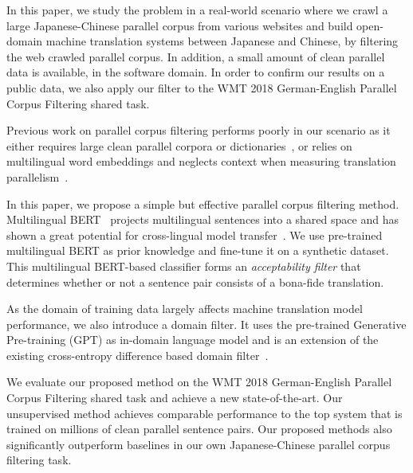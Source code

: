\documentclass[11pt,a4paper]{article}
\begin{document}
In this paper, we study the problem in a real-world scenario where we crawl a large Japanese-Chinese parallel corpus from various websites and build open-domain machine translation systems between Japanese and Chinese, by filtering the web crawled parallel corpus. In addition, a small amount of clean parallel data is available, in the software domain.  In order to confirm our results on a public data, we also apply our filter to the WMT 2018 German-English Parallel Corpus Filtering shared task.

Previous work on parallel corpus filtering performs poorly in our scenario as it either requires large clean parallel corpora or dictionaries~\cite{xu2017zipporah,artetxe2018margin,junczys2018dual,chaudhary2019low}, or relies on multilingual word embeddings and neglects context when measuring translation parallelism~\cite{hangya2018unsupervised}.




In this paper, we propose a simple but effective parallel corpus filtering method.
Multilingual BERT~\cite{devlin2018bert} projects multilingual sentences into a shared space and has shown a great potential for cross-lingual model transfer~\cite{pires2019multilingual}. We use pre-trained multilingual BERT as prior knowledge
and fine-tune it on a synthetic dataset. 
This multilingual BERT-based classifier forms an {\em acceptability filter} that determines whether or not a sentence pair consists of a bona-fide translation.

As the domain of training data largely affects machine translation model performance, we also introduce a domain filter. It uses the pre-trained Generative Pre-training (GPT) as in-domain language model and is an extension of the existing cross-entropy difference based domain filter~\cite{moore-lewis-2010-intelligent,junczys2018dual}.

We evaluate our proposed method on the WMT 2018 German-English Parallel Corpus Filtering shared task and achieve a new state-of-the-art. Our unsupervised method achieves comparable performance to the top system that is trained on millions of clean parallel sentence pairs. Our proposed methods also significantly outperform baselines in our own Japanese-Chinese parallel corpus filtering task. 
\end{document}
